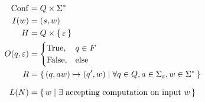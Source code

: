 \begin{definition}
    \begin{align*}
        { \mathrm{Conf} } &= Q \times \Sigma^*
        \\
        I(w)  &= (s, w)
        \\
        H     &= Q \times { \left\{\,\varepsilon\,\right\} }
        \\
        O(q,\varepsilon) &=
                            \begin{cases}
                                { \text{\upshape True} },  & q \in F  \\
                                { \text{\upshape False} }, & \text{else}
                            \end{cases}
        \\
        R &= { \left\{\,
            (q,aw) \mapsto (q',w) \mid
            \forall q \in Q, a \in \Sigma_\varepsilon, w \in \Sigma^*
        \,\right\} }
    \end{align*}
\end{definition}

\begin{definition}
    \[
        L(N) = { \left\{\, w \mid \exists \text{ accepting computation on input $w$} \,\right\} }
    \]
\end{definition}

